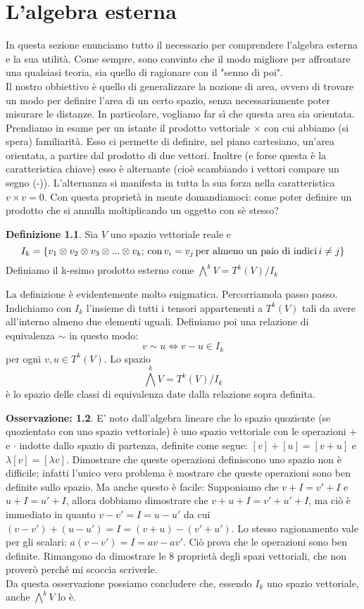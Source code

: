 \documentclass[12pt,a4paper]{report}
\theoremstyle{definition}
\newtheorem{Def}{Definizione}[chapter]
\theoremstyle{Theorem}
\theoremstyle{definition}
\theoremstyle{definition}
\theoremstyle{definition}
\newtheorem{Obs}[Def]{Osservazione:}
\begin{document}
	\chapter{L'algebra esterna}
	In questa sezione enunciamo tutto il necessario per comprendere l'algebra esterna e la sua utilità. Come sempre, sono convinto che il modo migliore per affrontare una qualsiasi teoria, sia quello di ragionare con il "senno di poi".\\
	Il nostro obbiettivo è quello di generalizzare la nozione di area, ovvero di trovare un modo per definire l'area di un certo spazio, senza necessariamente poter misurare le distanze. In particolare, vogliamo far sì che questa area sia orientata. Prendiamo in esame per un istante il prodotto vettoriale $\times$ con cui abbiamo (si spera) familiarità. Esso ci permette di definire, nel piano cartesiano, un'area orientata, a partire dal prodotto di due vettori. Inoltre (e forse questa è la caratteristica chiave) esso è alternante (cioè scambiando i vettori compare un segno (-)). L'alternanza si manifesta in tutta la sua forza nella caratteristica $v\times v=0$. Con questa proprietà in mente domandiamoci: come poter definire un prodotto che si annulla moltiplicando un oggetto con sè stesso?
	\begin{Def}
		Sia $V$ uno spazio vettoriale reale e $$I_k=\{v_1\otimes v_2\otimes v_3\otimes...\otimes v_k; \, \hbox{con} \, v_i=v_j \, \hbox{per almeno un paio di indici} \, i\neq j \}$$
		 Definiamo il k-esimo prodotto esterno come $\bigwedge^kV=T^k(V)/I_k$
	\end{Def}
La definizione è evidentemente molto enigmatica. Percorriamola passo passo. Indichiamo con $I_k$ l'insieme di tutti i tensori appartenenti a $T^k(V)$ tali da avere all'interno almeno due elementi uguali. Definiamo poi una relazione di equivalenza $\sim$ in questo modo:
$$v\sim u\Longleftrightarrow v-u\in I_k$$ per ogni $v,u\in T^k(V)$.
Lo spazio $$\bigwedge^kV=T^k(V)/I_k$$ è lo spazio delle classi di equivalenza date dalla relazione sopra definita. 
\begin{Obs}
	E' noto dall'algebra lineare che lo spazio quoziente (se quozientato con uno spazio vettoriale) è uno spazio vettoriale con le operazioni $+$ e $\cdot$ indotte dallo spazio di partenza, definite come segue: $[v]+[u]=[v+u]$ e $\lambda[v]=[\lambda v]$. Dimostrare che queste operazioni definiscono uno spazio non è difficile; infatti l'unico vero problema è mostrare che queste operazioni sono ben definite sullo spazio. Ma anche questo è facile:
	Supponiamo che $v+I=v'+I$ e $u+I=u'+I$, allora dobbiamo dimostrare che $v+u+I=v'+u'+I$, ma ciò è immediato in quanto $v-v'=I=u-u'$ da cui $(v-v')+(u-u')=I=(v+u)-(v'+u')$. Lo stesso ragionamento vale per gli scalari: $a(v-v')=I=av-av'$. Ciò prova che le operazioni sono ben definite. Rimangono da dimostrare le 8 proprietà degli spazi vettoriali, che non proverò perché mi scoccia scriverle.\\
	Da questa osservazione possiamo concludere che, essendo $I_k$ uno spazio vettoriale, anche $\bigwedge^kV$ lo è.
\end{Obs}
\end{document}
